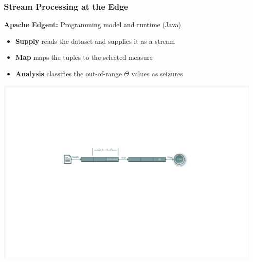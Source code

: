\documentclass[xelatex,usenames,dvipsnames]{beamer}
\begin{document}
  \begin{frame}
    \frametitle{Stream Processing at the Edge}
    \textbf{Apache Edgent:} Programming model and runtime (Java)

    \begin{itemize}
      \item \textbf{Supply} reads the dataset and supplies it as a stream
      \item \textbf{Map} maps the tuples to the selected measure
      \item \textbf{Analysis} classifies the out-of-range \(\Theta\) values
      as seizures
    \end{itemize}

    \includegraphics[width = \textwidth]{figs/Edgent_pipeline.pdf}
    
  \end{frame}
\end{document}
